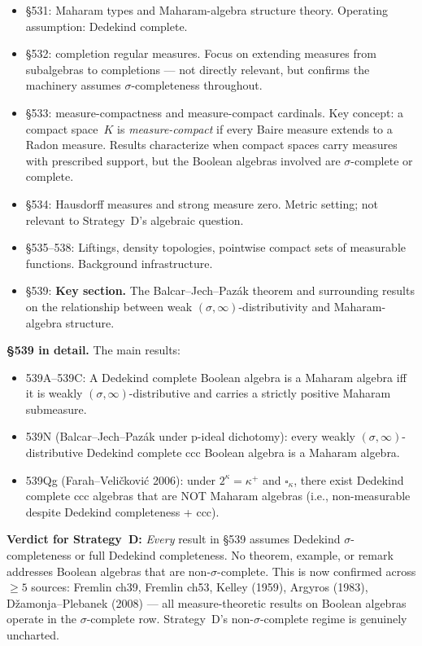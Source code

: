 \begin{itemize}[nosep]
  \item \S531: Maharam types and Maharam-algebra structure theory.
    Operating assumption: Dedekind complete.
  \item \S532: completion regular measures.  Focus on extending measures
    from subalgebras to completions --- not directly relevant, but
    confirms the machinery assumes $\sigma$-completeness throughout.
  \item \S533: measure-compactness and measure-compact cardinals.  Key
    concept: a compact space~$K$ is \emph{measure-compact} if every
    Baire measure extends to a Radon measure.  Results characterize when
    compact spaces carry measures with prescribed support, but the
    Boolean algebras involved are $\sigma$-complete or complete.
  \item \S534: Hausdorff measures and strong measure zero.  Metric
    setting; not relevant to Strategy~D's algebraic question.
  \item \S535--538: Liftings, density topologies, pointwise compact sets
    of measurable functions.  Background infrastructure.
  \item \S539: \textbf{Key section.}  The Balcar--Jech--Paz\'{a}k
    theorem and surrounding results on the relationship between
    weak $(\sigma,\infty)$-distributivity and Maharam-algebra structure.
\end{itemize}

\textbf{\S539 in detail.}  The main results:

\begin{itemize}[nosep]
  \item 539A--539C: A Dedekind complete Boolean algebra is a Maharam
    algebra iff it is weakly $(\sigma,\infty)$-distributive and carries
    a strictly positive Maharam submeasure.
  \item 539N (Balcar--Jech--Paz\'{a}k under p-ideal dichotomy): every
    weakly $(\sigma,\infty)$-distributive Dedekind complete ccc Boolean
    algebra is a Maharam algebra.
  \item 539Qg (Farah--Veli\v{c}kovi\'{c} 2006): under
    $2^\kappa = \kappa^+$ and $\square_\kappa$, there exist Dedekind
    complete ccc algebras that are NOT Maharam algebras (i.e.,
    non-measurable despite Dedekind completeness + ccc).
\end{itemize}

\textbf{Verdict for Strategy~D:} \emph{Every} result in \S539 assumes
Dedekind $\sigma$-completeness or full Dedekind completeness.  No
theorem, example, or remark addresses Boolean algebras that are
non-$\sigma$-complete.  This is now confirmed across $\geq 5$ sources:
Fremlin ch39, Fremlin ch53, Kelley (1959), Argyros (1983),
D\v{z}amonja--Plebanek (2008) --- all measure-theoretic results on
Boolean algebras operate in the $\sigma$-complete row.  Strategy~D's
non-$\sigma$-complete regime is genuinely uncharted.

